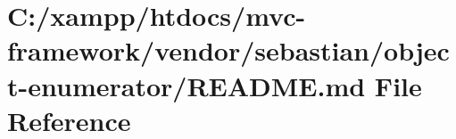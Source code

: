 \hypertarget{vendor_2sebastian_2object-enumerator_2_r_e_a_d_m_e_8md}{}\section{C\+:/xampp/htdocs/mvc-\/framework/vendor/sebastian/object-\/enumerator/\+R\+E\+A\+D\+ME.md File Reference}
\label{vendor_2sebastian_2object-enumerator_2_r_e_a_d_m_e_8md}
